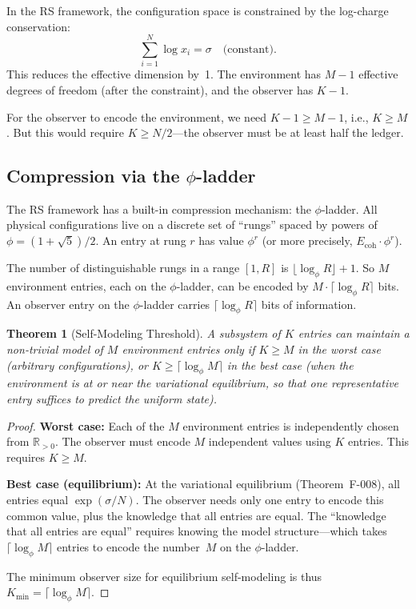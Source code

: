 \documentclass[11pt,a4paper]{article}
\theoremstyle{plain}
\newtheorem{theorem}{Theorem}[section]
\theoremstyle{definition}
\theoremstyle{remark}
\newcommand{\Rp}{\mathbb{R}_{>0}}
\begin{document}
In the RS framework, the configuration space is constrained by the
log-charge conservation:
\[
  \sum_{i=1}^N \log x_i = \sigma \quad\text{(constant)}.
\]
This reduces the effective dimension by~1.  The environment has
$M - 1$ effective degrees of freedom (after the constraint), and the
observer has $K - 1$.

For the observer to encode the environment, we need
$K - 1 \geq M - 1$, i.e., $K \geq M$.  But this would require
$K \geq N/2$---the observer must be at least half the ledger.

\subsection{Compression via the $\phi$-ladder}

The RS framework has a built-in compression mechanism: the $\phi$-ladder.
All physical configurations live on a discrete set of ``rungs'' spaced
by powers of $\phi = (1 + \sqrt{5})/2$.  An entry at rung $r$ has value
$\phi^r$ (or more precisely, $E_{\text{coh}} \cdot \phi^r$).

The number of distinguishable rungs in a range $[1, R]$ is
$\lfloor\log_\phi R\rfloor + 1$.  So $M$ environment entries, each on
the $\phi$-ladder, can be encoded by $M \cdot \lceil\log_\phi R\rceil$
bits.  An observer entry on the $\phi$-ladder carries
$\lceil\log_\phi R\rceil$ bits of information.

\begin{theorem}[Self-Modeling Threshold]
\label{thm:threshold}
A subsystem of $K$ entries can maintain a non-trivial model of $M$
environment entries only if $K \geq M$ in the worst case (arbitrary
configurations), or $K \geq \lceil\log_\phi M\rceil$ in the best case
(when the environment is at or near the variational equilibrium, so
that one representative entry suffices to predict the uniform state).
\end{theorem}

\begin{proof}
\textbf{Worst case:}  Each of the $M$ environment entries is
independently chosen from $\Rp$.  The observer must encode $M$
independent values using $K$ entries.  This requires $K \geq M$.

\textbf{Best case (equilibrium):}  At the variational equilibrium
(Theorem~F-008), all entries equal $\exp(\sigma/N)$.  The observer needs
only one entry to encode this common value, plus the knowledge that all
entries are equal.  The ``knowledge that all entries are equal'' requires
knowing the model structure---which takes $\lceil\log_\phi M\rceil$
entries to encode the number~$M$ on the $\phi$-ladder.

The minimum observer size for equilibrium self-modeling is thus
$K_{\min} = \lceil\log_\phi M\rceil$.
\end{proof}
\end{document}
